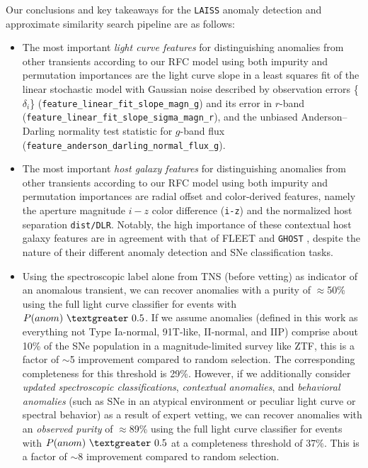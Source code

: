 \documentclass[twocolumn]{aastex63}
\newcommand{\laiss}{\texttt{LAISS}}
\begin{document}
Our conclusions and key takeaways for the \laiss{} anomaly detection and approximate similarity search pipeline are as follows:
\begin{itemize}
    \item The most important \emph{light curve features} for distinguishing anomalies from other transients according to our RFC model using both impurity and permutation importances are the light curve slope in a least squares fit of the linear stochastic model with Gaussian noise described by observation errors \{$\delta_{i}$\} (\texttt{feature\_linear\_fit\_slope\_magn\_g}) and its error in $r$-band \\(\texttt{feature\_linear\_fit\_slope\_sigma\_magn\_r}), and the unbiased Anderson–Darling normality test statistic for $g$-band flux \\ (\texttt{feature\_anderson\_darling\_normal\_flux\_g}). 
    \item The most important \emph{host galaxy features} for distinguishing anomalies from other transients according to our RFC model using both impurity and permutation importances are radial offset and color-derived features, namely the aperture magnitude $i-z$ color difference (\texttt{i-z}) and the normalized host separation \texttt{dist/DLR}. Notably, the high importance of these contextual host galaxy features are in agreement with that of FLEET \citep{Gomez2020, Gomez2023SLSN, Gomez2023TDE} and \texttt{GHOST} \citep{Gagliano2021}, despite the nature of their different anomaly detection and SNe classification tasks.
    \item Using the spectroscopic label alone from TNS (before vetting) as indicator of an anomalous transient, we can recover anomalies with a purity of $\approx$50\% using the full light curve classifier for events with $P(anom)~\textgreater~0.5$. If we assume anomalies (defined in this work as everything not Type Ia-normal, 91T-like, II-normal, and IIP) comprise about 10\% of the SNe population in a magnitude-limited survey like ZTF, this is a factor of $\sim$5 improvement compared to random selection. The corresponding completeness for this threshold is 29\%. However, if we additionally consider \emph{updated spectroscopic classifications}, \emph{contextual anomalies}, and \emph{behavioral anomalies} (such as SNe in an atypical environment or peculiar light curve or spectral behavior) as a result of expert vetting, we can recover anomalies with an \emph{observed purity} of $\approx$89\% using the full light curve classifier for events with $P(anom)~\textgreater~0.5$ at a completeness threshold of 37\%. This is a factor of $\sim$8 improvement compared to random selection.

\end{itemize}
\end{document}
